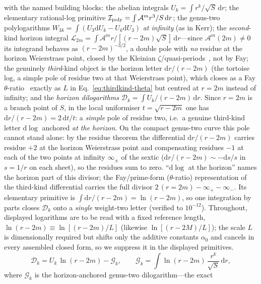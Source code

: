 \documentclass[12pt]{iopart}
\newcommand{\dd}{\mathrm{d}}
\begin{document}
with the named building blocks: the abelian integrals $U_k=\int r^k/\sqrt S\,\dd r$;
the elementary rational-log primitive
$\mathcal{I}_{\rm poly}=\int\mathcal{A}^m r^3/S\,\dd r$; the genus-two
polylogarithms $W_{3k}=\int(U_3\dd U_k-U_k\dd U_3)$ \emph{at infinity} (as in Kerr);
the \emph{second}-kind horizon integral
$\mathcal{L}_{2m}=\int\mathcal{A}^m r/[(r-2m)\sqrt S]\,\dd r$---since
$\mathcal{A}^m(2m)\ne0$ its integrand behaves as $(r-2m)^{-3/2}$, a double pole with
\emph{no} residue at the horizon Weierstrass point, closed by the Kleinian
$\zeta$/quasi-periods~\cite{BuchstaberEnolskii1997,BakerAbelian1897}, not by Fay; the
genuinely \emph{third}-kind object is the horizon letter $\dd r/(r-2m)$ (the tortoise
log, a simple pole of residue two at that Weierstrass point), which closes as a Fay
$\theta$-ratio~\cite{Fay1973} exactly as $L$ in Eq.~\eqref{eq:thirdkind-theta} but
centred at $r=2m$ instead of infinity; and
the \emph{horizon dilogarithms} $\mathcal{D}_k=\int U_k/(r-2m)\,\dd r$. Since $r=2m$
is a branch point of $S$, in the local uniformiser $t=\sqrt{r-2m}$ one has
$\dd r/(r-2m)=2\,\dd t/t$: a \emph{simple} pole of residue two, i.e.\ a genuine
third-kind letter $\dd\log$ anchored \emph{at the horizon}. On the compact
genus-two curve this pole cannot stand alone: by the residue theorem the
differential $\dd r/(r-2m)$ carries residue $+2$ at the horizon Weierstrass point
and compensating residues $-1$ at each of the two points at infinity $\infty_\pm$ of
the sextic ($\dd r/(r-2m)\sim-\dd s/s$ in $s=1/r$ on each sheet), so the residues sum
to zero. ``$\dd\log$ at the horizon'' names the horizon part of this divisor; the
Fay/prime-form ($\theta$-ratio) representation of the third-kind differential carries
the full divisor $2\,(r{=}2m)-\infty_+-\infty_-$. Its elementary primitive
is $\int\dd r/(r-2m)=\ln(r-2m)$, so one integration by parts closes $\mathcal{D}_k$
onto a \emph{single} weight-two letter (verified to $10^{-12}$). Throughout, displayed
logarithms are to be read with a fixed reference length, $\ln(r-2m)\equiv\ln[(r-2m)/L]$
(likewise $\ln[(r-2M)/L]$); the scale $L$ is dimensionally required but shifts only the
additive constants $\alpha_0$ and cancels in every assembled closed form, so we suppress
it in the displayed primitives.
\begin{equation}
    \mathcal{D}_k=U_k\,\ln(r-2m)-\mathcal{G}_k,\qquad
    \mathcal{G}_k=\int\ln(r-2m)\,\frac{r^k}{\sqrt S}\,\dd r,
    \label{eq:horizon-dilog}
\end{equation}
where $\mathcal{G}_k$ is the horizon-anchored genus-two dilogarithm---the exact
\end{document}
